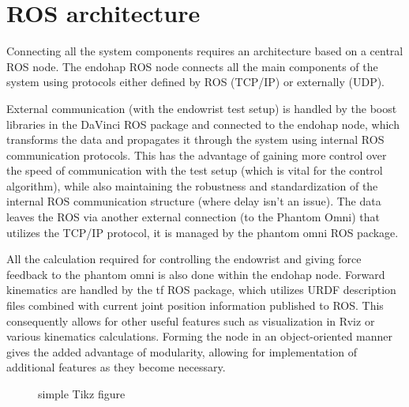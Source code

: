 \section{ROS architecture}

Connecting all the system components requires an architecture based on a central ROS node.
The endohap ROS node connects all the main components of the system using protocols either defined by ROS (TCP/IP) or externally (UDP).

External communication (with the endowrist test setup) is handled by the boost libraries in the DaVinci ROS package and connected to the endohap node, which transforms the data and propagates it through the system using internal ROS communication protocols. 
This has the advantage of gaining more control over the speed of communication with the test setup (which is vital for the control algorithm), while also maintaining the robustness and standardization of the internal ROS communication structure (where delay isn't an issue). The data leaves the ROS via another external connection (to the Phantom Omni) that utilizes the TCP/IP protocol, it is managed by the phantom omni ROS package.

All the calculation required for controlling the endowrist and giving force feedback to the phantom omni is also done within the endohap node. Forward kinematics are handled by the tf ROS package, which utilizes URDF description files combined with current joint position information published to ROS.
This consequently allows for other useful features such as visualization in Rviz or various kinematics calculations.
Forming the node in an object-oriented manner gives the added advantage of modularity, allowing for implementation of additional features as they become necessary. 

\begin{figure}[H]
\centering
{}%
\caption{simple Tikz figure}
\end{figure}

